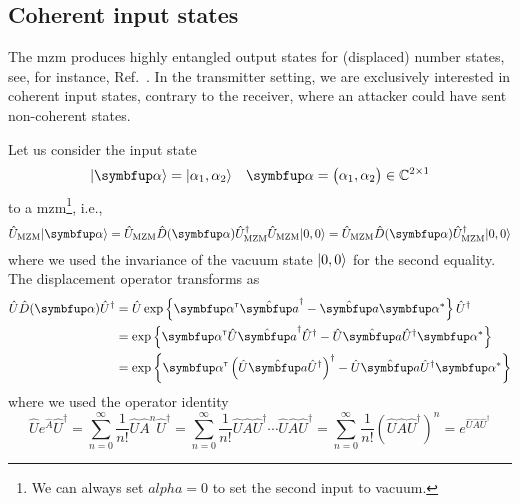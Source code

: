 \subsection{Coherent input states}

The \gls{mzm} produces highly entangled output states for (displaced) number states, see, for instance, Ref.~\cite{Windhager2011}.
In the transmitter setting, we are exclusively interested in coherent input states, contrary to the receiver, where an attacker could have sent non-coherent states.

Let us consider the input state
\begin{align}
	\ket{\vb{\alpha}}
	&=
	\ket{\alpha_1,\alpha_2}
	&
	\vb{\alpha}
	=
	\begin{pmatrix}
		\alpha_1,
		\alpha_2
	\end{pmatrix}
	\in
	\mathbb{C}^{2\times1}
\end{align}
to a \gls{mzm}\footnote{We can always set $alpha=0$ to set the second input to vacuum.}, i.e.,
\begin{equation}
	\hat{U}_\text{MZM}
	\ket{\vb{\alpha}}
	=
	\hat{U}_\text{MZM}
	\hat{D}(\vb{\alpha})
	\hat{U}_\text{MZM}^\dagger
	\hat{U}_\text{MZM}
	\ket{0,0}
	=
	\hat{U}_\text{MZM}
	\hat{D}(\vb{\alpha})
	\hat{U}_\text{MZM}^\dagger
	\ket{0,0}
\end{equation}
where we used the invariance of the vacuum state $\lvert0,0\rangle$ for the second equality.
The displacement operator transforms as
\begin{equation}
	\begin{split}
		\hat{U}
		\hat{D}(\vb{\alpha})
		\hat{U}^\dagger
		&=
		\hat{U}
		\exp\left\{
			\vb{\alpha}^\trans
			\hat{\vb{a}}^\dagger
			-
			\hat{\vb{a}}
			\vb{\alpha}^*
		\right\}
		\hat{U}^\dagger
		\\
		&=
		\exp\left\{
			\vb{\alpha}^\trans
			\hat{U}
			\hat{\vb{a}}^\dagger
			\hat{U}^\dagger
			-
			\hat{U}
			\hat{\vb{a}}
			\hat{U}^\dagger
			\vb{\alpha}^*
		\right\}
		\\
		&=
		\exp\left\{
			\vb{\alpha}^\trans
			\left(
				\hat{U}
				\hat{\vb{a}}
				\hat{U}^\dagger
			\right)^\dagger
			-
			\hat{U}
			\hat{\vb{a}}
			\hat{U}^\dagger
			\vb{\alpha}^*
		\right\}
	\end{split}
\end{equation}
where we used the operator identity
\begin{equation}
	\hat{U}
	e^{\hat{A}}
	\hat{U}^\dagger
	=
	\sum_{n=0}^\infty
	\frac{1}{n!}
	\hat{U}
	\hat{A}^n
	\hat{U}^\dagger
	=
	\sum_{n=0}^\infty
	\frac{1}{n!}
	\hat{U}
	\hat{A}
	\hat{U}^\dagger
	\cdots
	\hat{U}
	\hat{A}
	\hat{U}^\dagger
	=
	\sum_{n=0}^\infty
	\frac{1}{n!}
	\left(
		\hat{U}
		\hat{A}
		\hat{U}^\dagger
	\right)^n
	=
	e^{\hat{U}\hat{A}\hat{U}^\dagger}
\end{equation}
